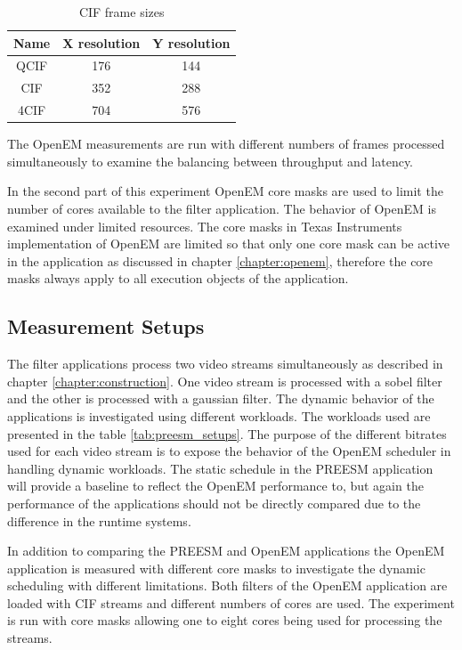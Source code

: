 \begin{table}
    \begin{center}
        \begin{tabular}{ c c c }
            Name  & X resolution  & Y resolution \\ \hline
            QCIF  & 176           & 144          \\ \hline
            CIF   & 352           & 288          \\ \hline
            4CIF  & 704           & 576          \\ \hline
        \end{tabular}
        \caption{CIF frame sizes}
        \label{tab:cif_frames}
    \end{center}
\end{table}

The OpenEM measurements are run with different numbers of frames processed
simultaneously to examine the balancing between throughput and latency.

In the second part of this experiment OpenEM core masks are used to limit the
number of cores available to the filter application. The behavior of OpenEM is
examined under limited resources. The core masks in Texas Instruments
implementation of OpenEM are limited so that only one core mask can be active in
the application as discussed in chapter \ref{chapter:openem}, therefore the core
masks always apply to all execution objects of the application.

\subsection{Measurement Setups}
The filter applications process two video streams simultaneously as described in
chapter \ref{chapter:construction}. One video stream is processed with a sobel
filter and the other is processed with a gaussian filter. The dynamic behavior
of the applications is investigated using different workloads. The workloads
used are presented in the table \ref{tab:preesm_setups}. The purpose of the
different bitrates used for each video stream is to expose the behavior of the
OpenEM scheduler in handling dynamic workloads. The static schedule in the
PREESM application will provide a baseline to reflect the OpenEM performance to,
but again the performance of the applications should not be directly compared
due to the difference in the runtime systems.

In addition to comparing the PREESM and OpenEM applications the OpenEM
application is measured with different core masks to investigate the dynamic
scheduling with different limitations. Both filters of the OpenEM application
are loaded with CIF streams and different numbers of cores are used. The
experiment is run with core masks allowing one to eight cores being used for
processing the streams.

